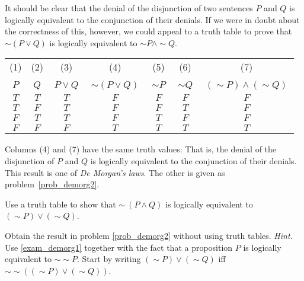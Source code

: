 \begin{exam}\label{exam_demorg1} It should be clear that the denial of the disjunction of two
sentences $P$ and $Q$ is logically equivalent to the conjunction of their denials. If we were
in doubt about the correctness of this, however, we could appeal to a truth table to prove
that $\sim(P \lor Q)$ is logically equivalent to $\sim P \land \sim Q$.

 \begin{center}
  \begin{tabular}{|c|c||c|c|c|c|c|}\hline
           (1)  &   (2)   &       (3)      &      (4)             &      (5)     &     (6)      &               (7)              \\
        \,$P$\, & \,$Q$\, & \,$P \lor Q$\, & \,$\sim(P \lor Q)$\, & \,$\sim P$\, & \,$\sim Q$\, & \,$(\sim P) \land (\sim Q)$\,  \\
    \hline\hline
          $T$   &   $T$   &       $T$      &      $F$             &       $F$    &     $F$      &               $F$              \\
    \hline
          $T$   &   $F$   &       $T$      &      $F$             &       $F$    &     $T$      &               $F$              \\
    \hline
          $F$   &   $T$   &       $T$      &      $F$             &       $T$    &     $F$      &               $F$              \\
    \hline
          $F$   &   $F$   &       $F$      &      $T$             &       $T$    &     $T$      &               $T$              \\
    \hline
  \end{tabular}
 \end{center}
Columns (4) and (7) have the same truth values: That is, the denial of the disjunction of $P$
and $Q$ is logically equivalent to the conjunction of their denials. This result is one of
\emph{De Morgan's laws}. The other is given as
problem~\ref{prob_demorg2}.
\end{exam}


\begin{prob}\label{prob_demorg2} Use a truth table to show that $\sim~(P \land Q)$
is logically equivalent to $(\sim P) \lor (\sim Q)$.
\end{prob}

\begin{prob} Obtain the result in problem \ref{prob_demorg2} without using truth tables.
\emph{Hint.} Use \ref{exam_demorg1} together with the fact that a proposition $P$ is logically
equivalent to $\sim\sim P$. Start by writing $(\sim P) \lor (\sim Q)$ iff $\sim\sim((\sim P)
\lor (\sim Q))$.
\end{prob}

